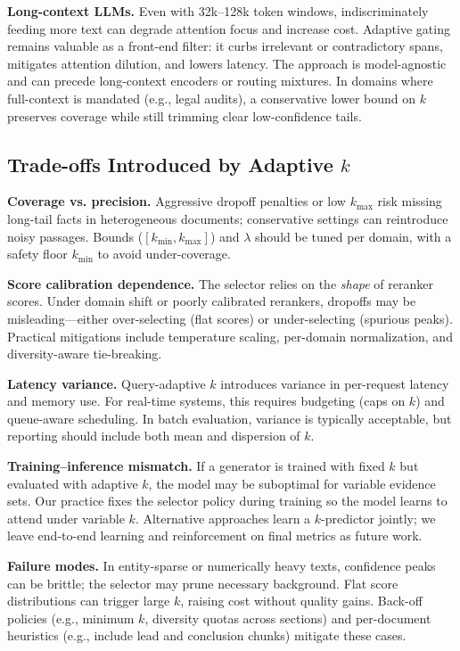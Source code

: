 \documentclass[11pt,a4paper]{article}
\begin{document}
\textbf{Long-context LLMs.} Even with 32k–128k token windows, indiscriminately feeding more text can degrade attention focus and increase cost. Adaptive gating remains valuable as a front-end filter: it curbs irrelevant or contradictory spans, mitigates attention dilution, and lowers latency. The approach is model-agnostic and can precede long-context encoders or routing mixtures. In domains where full-context is mandated (e.g., legal audits), a conservative lower bound on $k$ preserves coverage while still trimming clear low-confidence tails.

\subsection{Trade-offs Introduced by Adaptive $k$}

\textbf{Coverage vs. precision.} Aggressive dropoff penalties or low $k_{\max}$ risk missing long-tail facts in heterogeneous documents; conservative settings can reintroduce noisy passages. Bounds ($[k_{\min},k_{\max}]$) and $\lambda$ should be tuned per domain, with a safety floor $k_{\min}$ to avoid under-coverage.

\textbf{Score calibration dependence.} The selector relies on the \emph{shape} of reranker scores. Under domain shift or poorly calibrated rerankers, dropoffs may be misleading—either over-selecting (flat scores) or under-selecting (spurious peaks). Practical mitigations include temperature scaling, per-domain normalization, and diversity-aware tie-breaking.

\textbf{Latency variance.} Query-adaptive $k$ introduces variance in per-request latency and memory use. For real-time systems, this requires budgeting (caps on $k$) and queue-aware scheduling. In batch evaluation, variance is typically acceptable, but reporting should include both mean and dispersion of $k$.

\textbf{Training–inference mismatch.} If a generator is trained with fixed $k$ but evaluated with adaptive $k$, the model may be suboptimal for variable evidence sets. Our practice fixes the selector policy during training so the model learns to attend under variable $k$. Alternative approaches learn a $k$-predictor jointly; we leave end-to-end learning and reinforcement on final metrics as future work.

\textbf{Failure modes.} In entity-sparse or numerically heavy texts, confidence peaks can be brittle; the selector may prune necessary background. Flat score distributions can trigger large $k$, raising cost without quality gains. Back-off policies (e.g., minimum $k$, diversity quotas across sections) and per-document heuristics (e.g., include lead and conclusion chunks) mitigate these cases.
\end{document}
